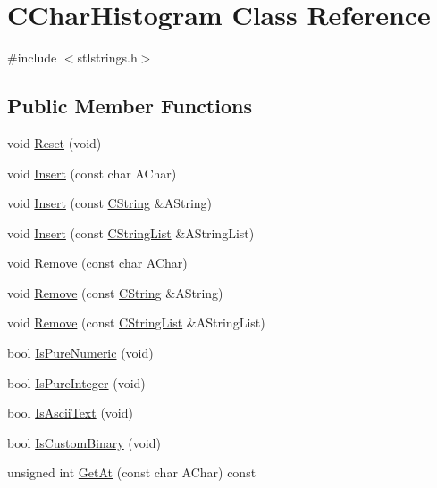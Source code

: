 \hypertarget{classCCharHistogram}{\section{C\-Char\-Histogram Class Reference}
\label{classCCharHistogram}
}


{\ttfamily \#include $<$stlstrings.\-h$>$}

\subsection*{Public Member Functions}
\begin{DoxyCompactItemize}
\item 
void \hyperlink{classCCharHistogram_ac1d1a5fb7c245cf4e84d58bb15ca7ba0}{Reset} (void)
\item 
void \hyperlink{classCCharHistogram_aa0384eefe70ccbe0e467bad1e3d2ecf7}{Insert} (const char A\-Char)
\item 
void \hyperlink{classCCharHistogram_a6a53c608c11ff86f1047947dc629256b}{Insert} (const \hyperlink{classCString}{C\-String} \&A\-String)
\item 
void \hyperlink{classCCharHistogram_af0dcfdbdc97076906feb7e1b37a1f29a}{Insert} (const \hyperlink{classCStringList}{C\-String\-List} \&A\-String\-List)
\item 
void \hyperlink{classCCharHistogram_ae43ca9363f00e6d84379b548497ab6f5}{Remove} (const char A\-Char)
\item 
void \hyperlink{classCCharHistogram_a344701a235d295a1e2e93a22d0c0ab9d}{Remove} (const \hyperlink{classCString}{C\-String} \&A\-String)
\item 
void \hyperlink{classCCharHistogram_a58dbb3bd6839d5b7de46c1f30f96f025}{Remove} (const \hyperlink{classCStringList}{C\-String\-List} \&A\-String\-List)
\item 
bool \hyperlink{classCCharHistogram_ac4caddfbf04efa132cbd3aa4ef8e0f48}{Is\-Pure\-Numeric} (void)
\item 
bool \hyperlink{classCCharHistogram_ad7711ea7c3bfcefaa02da602e5c84872}{Is\-Pure\-Integer} (void)
\item 
bool \hyperlink{classCCharHistogram_a2b5bdec0b8d532d36f978d58956e9dc4}{Is\-Ascii\-Text} (void)
\item 
bool \hyperlink{classCCharHistogram_a6b472044ac6a46ce9a16369bbc92c869}{Is\-Custom\-Binary} (void)
\item 
unsigned int \hyperlink{classCCharHistogram_ac2f5b10b78260e6a7f2b33a9ef22e093}{Get\-At} (const char A\-Char) const 

\end{DoxyCompactItemize}
